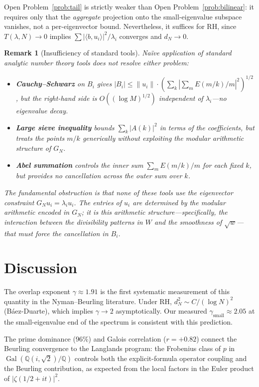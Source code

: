 \documentclass[11pt,a4paper]{article}
\newtheorem{remark}{Remark}
\begin{document}
Open Problem~\ref{prob:tail} is strictly weaker than Open Problem~\ref{prob:bilinear}: it requires only that the \emph{aggregate} projection onto the small-eigenvalue subspace vanishes, not a per-eigenvector bound. Nevertheless, it suffices for RH, since $T(\lambda,N) \to 0$ implies $\sum |\langle b, u_i\rangle|^2/\lambda_i$ converges and $d_N \to 0$.

\begin{remark}[Insufficiency of standard tools]\label{rem:tools}
Na\"ive application of standard analytic number theory tools does not resolve either problem:
\begin{itemize}
\item \textbf{Cauchy--Schwarz} on $B_i$ gives $|B_i| \leq \|u_i\| \cdot (\sum_k |\sum_m E(m/k)/m|^2)^{1/2}$, but the right-hand side is $O((\log M)^{1/2})$ independent of $\lambda_i$---no eigenvalue decay.
\item \textbf{Large sieve inequality} bounds $\sum_k |A(k)|^2$ in terms of the coefficients, but treats the points $m/k$ generically without exploiting the modular arithmetic structure of $G_N$.
\item \textbf{Abel summation} controls the inner sum $\sum_m E(m/k)/m$ for each fixed $k$, but provides no cancellation across the outer sum over $k$.
\end{itemize}
The fundamental obstruction is that none of these tools use the eigenvector constraint $G_N u_i = \lambda_i u_i$. The entries of $u_i$ are determined by the modular arithmetic encoded in $G_N$; it is this arithmetic structure---specifically, the interaction between the divisibility patterns in $W$ and the smoothness of $\sqrt{w}$---that must force the cancellation in $B_i$.
\end{remark}

\section{Discussion}

The overlap exponent $\gamma \approx 1.91$ is the first systematic measurement of this quantity in the Nyman--Beurling literature. Under RH, $d_N^2 \sim C/(\log N)^2$ (B\'aez-Duarte), which implies $\gamma \to 2$ asymptotically. Our measured $\gamma_{\text{small}} \approx 2.05$ at the small-eigenvalue end of the spectrum is consistent with this prediction.

The prime dominance ($96\%$) and Galois correlation ($r = +0.82$) connect the Beurling convergence to the Langlands program: the Frobenius class of $p$ in $\operatorname{Gal}(\mathbb{Q}(i,\sqrt{2})/\mathbb{Q})$ controls both the explicit-formula operator coupling and the Beurling contribution, as expected from the local factors in the Euler product of $|\zeta(1/2 + it)|^2$.
\end{document}
